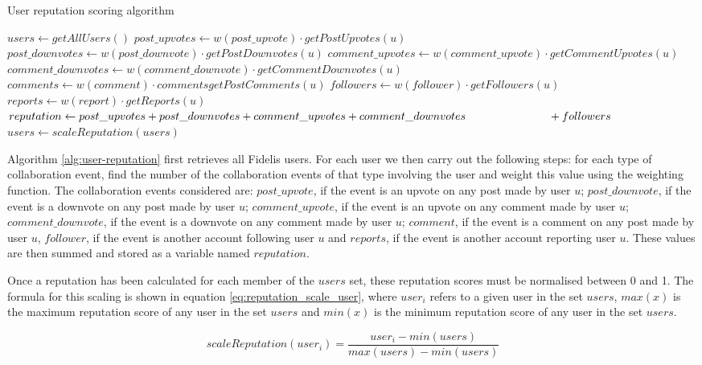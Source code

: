 \newcommand{\myindent}[1]{
\newline\makebox[#1cm]{}
}

\begin{algorithm}[H]
\caption{User reputation scoring algorithm}
\label{alg:user-reputation}
\begin{algorithmic}[1]
\State $users\gets getAllUsers()$
	\State $post\_upvotes\gets w(post\_upvote)\cdot getPostUpvotes(u)$
	\State $post\_downvotes\gets w(post\_downvote)\cdot getPostDownvotes(u)$
	\State $comment\_upvotes\gets w(comment\_upvote)\cdot getCommentUpvotes(u)$
	\State $comment\_downvotes\gets w(comment\_downvote)\cdot getCommentDownvotes(u)$
	\State $comments\gets w(comment)\cdot commentsgetPostComments(u)$
	\State $followers\gets w(follower)\cdot getFollowers(u)$
	\State $reports\gets w(report)\cdot getReports(u)$
	\State $reputation\gets post\_upvotes + post\_downvotes + comment\_upvotes + comment\_downvotes \myindent{2.6} + followers$
\EndFor
\State $users\gets scaleReputation(users)$
\end{algorithmic}
\end{algorithm}

\noindent
Algorithm \ref{alg:user-reputation} first retrieves all Fidelis users. For each user we then carry out the following steps: for each type of collaboration event, find the number of the collaboration events of that type involving the user and weight this value using the weighting function. The collaboration events considered are: \(post\_upvote\), if the event is an upvote on any post made by user \(u\); \(post\_downvote\), if the event is a downvote on any post made by user \(u\); \(comment\_upvote\), if the event is an upvote on any comment made by user \(u\); \(comment\_downvote\), if the event is a downvote on any comment made by user \(u\); \(comment\), if the event is a comment on any post made by user \(u\), \(follower\), if the event is another account following user \(u\) and \(reports\), if the event is another account reporting user \(u\). These values are then summed and stored as a variable named \(reputation\).

Once a reputation has been calculated for each member of the \(users\) set, these reputation scores must be normalised between 0 and 1. The formula for this scaling is shown in equation \ref{eq:reputation_scale_user}, where $user_i$ refers to a given user in the set \(users\), \(max(x)\) is the maximum reputation score of any user in the set \(users\) and \(min(x)\) is the minimum reputation score of any user in the set \(users\).

\begin{equation}
	\label{eq:reputation_scale_user}
	scaleReputation(user_i) = \frac{user_i - min(users)}{max(users) - min(users)}
\end{equation}

